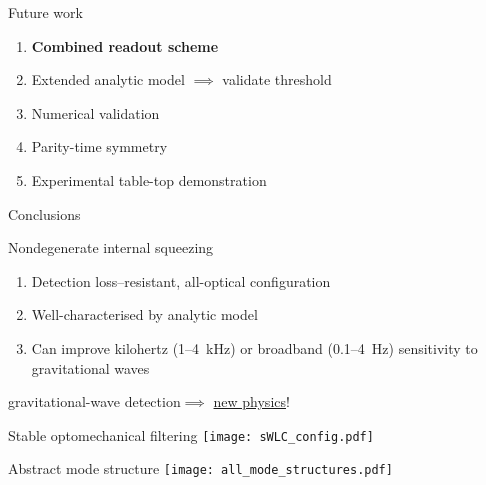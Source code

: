 \documentclass[12pt,xcolor=dvipsnames]{beamer}
\begin{document}
\begin{frame}{Future work}
	\begin{enumerate}
	\item \textbf{Combined readout scheme} %
	\item Extended analytic model $\implies$ validate threshold
	\item Numerical validation %
	\item Parity-time symmetry
	\item Experimental table-top demonstration 
	\end{enumerate}
\end{frame}

\begin{frame}{Conclusions}
\begin{block}{Nondegenerate internal squeezing}
\begin{enumerate}
\item Detection loss--resistant, all-optical configuration
\item Well-characterised by analytic model
\item Can improve kilohertz (1--4~kHz) or broadband (0.1--4~Hz) sensitivity to gravitational waves 
\end{enumerate}
\end{block}
\centering
\vspace{0.5cm}
{\large gravitational-wave detection$\implies$ \underline{new physics}!}
\end{frame}





\begin{frame}[noframenumbering]{Stable optomechanical filtering}
\centering
\texttt{[image: sWLC\_config.pdf]}
\end{frame}

\begin{frame}[noframenumbering]{Abstract mode structure}
\centering
\texttt{[image: all\_mode\_structures.pdf]}
\end{frame}
\end{document}
